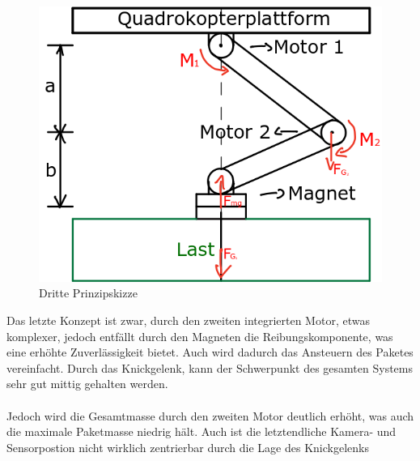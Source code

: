 \begin{figure}[h]
	\begin{center}
	\includegraphics[scale=0.7]{"Grafiken/Skizze3mechanik.png"}
	\caption{Dritte Prinzipskizze}
	\label{dritte_prinzipskizze}
	\end{center}
\end{figure}

Das letzte Konzept ist zwar, durch den zweiten integrierten Motor, etwas komplexer, jedoch entfällt durch den Magneten die Reibungskomponente, was eine erhöhte Zuverlässigkeit bietet. Auch wird dadurch das Ansteuern des Paketes vereinfacht. Durch das Knickgelenk, kann der Schwerpunkt des gesamten Systems sehr gut mittig gehalten werden.\\
\\
Jedoch wird die Gesamtmasse durch den zweiten Motor deutlich erhöht, was auch die maximale Paketmasse niedrig hält. Auch ist die letztendliche Kamera- und Sensorpostion nicht wirklich zentrierbar durch die Lage des Knickgelenks

